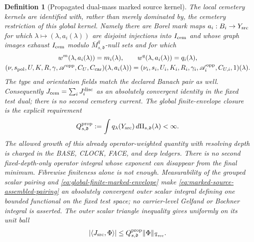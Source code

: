 \documentclass[11pt]{article}
\newtheorem{definition}[theorem]{Definition}
\begin{document}
\begin{definition}[Propagated dual-mass marked source kernel]
The local cemetery kernels are identified with, rather than merely
dominated by, the cemetery restriction of this global kernel.  Namely there
are Borel mark maps $a_i:B_i\to Y_{\rm src}$ for which
$\lambda\mapsto(\lambda,a_i(\lambda))$ are disjoint injections into
$I_{\rm cem}$ and whose graph images exhaust $I_{\rm cem}$ modulo
$\overline M_{s,\mathfrak d}^{q}$-null sets and for which
\begin{equation}
\label{eq:cemetery-global-kernel-identification}
\begin{gathered}
 w^m(\lambda,a_i(\lambda))=m_i(\lambda),\qquad
 w^q(\lambda,a_i(\lambda))=q_i(\lambda),\\
 (\nu,s_{\rm pol},U,K,R,\gamma,\mathscr A^{\rm opp},C_U,C_{\rm car})
   (\lambda,a_i(\lambda))
 = (\nu_i,s_i,U_i,K_i,R_i,\gamma_i,\mathscr A_i^{\rm opp},C_{U,i},1)(\lambda).
\end{gathered}
\end{equation}
The type and orientation fields match the declared Banach pair as well.
Consequently $J_{\rm cem}=\sum_iJ_i^{\rm disc}$ as an absolutely convergent
identity in the fixed test dual; there is no second cemetery current.
The global finite-envelope closure is the explicit requirement
\begin{equation}
\label{eq:global-finite-marked-envelope}
 Q_{s,\mathfrak d}^{\rm prop}:=\int q_\lambda(Y_{\rm src})
                  \,d\Pi_{s,\mathfrak d}(\lambda)<\infty.
\end{equation}
The allowed growth of this already operator-weighted quantity with resolving
depth is charged in the BASE, CLOCK, FACE, and deep ledgers.  There is no
second fixed-depth-only operator integral whose exponent can disappear from
the final minimum.  Fibrewise finiteness alone is not enough.  Measurability
of the grouped scalar pairing and
\eqref{eq:global-finite-marked-envelope} make
\eqref{eq:marked-source-assembled-pairing} an absolutely convergent outer
scalar integral defining one bounded functional on the fixed test space;
no carrier-level Gelfand or Bochner integral is asserted.  The outer scalar
triangle inequality gives uniformly on its unit ball
\begin{equation}
\label{eq:source-incidence-TV-bound}
 |\langle J_{\rm src},\Phi\rangle|
 \le Q_{s,\mathfrak d}^{\rm prop}\|\Phi\|_{\mathfrak T_{\rm src}}.
\end{equation}


\end{definition}
\end{document}
